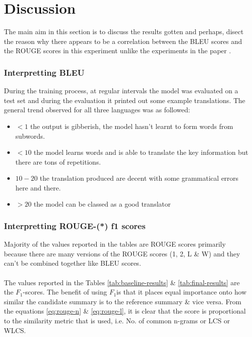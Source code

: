 \documentclass[12pt,a4paper,twoside,openright]{report}
\newcommand{\fone}{$F_1$}
\begin{document}
\section{Discussion}
\label{discussion}
The main aim in this section is to discuss the results gotten and perhaps, disect the reason why there appears to be a correlation between the BLEU scores and the ROUGE scores in this experiment unlike the experiments in the paper \cite{nguyen-daume-iii-2019-global}. 

\subsubsection{Interpretting BLEU}
During the training process, at regular intervals the model was evaluated on a test set and during the evaluation it printed out some example translations. The general trend observed for all three languages was as followed: 
\begin{itemize}
    \item $<1$ the output is gibberish, the model hasn't learnt to form words from subwords.
    \item $<10$ the model learns words and is able to translate the key information but there are tons of repetitions. 
    \item $10-20$ the translation produced are decent with some grammatical errors here and there. 
    \item $>20$ the model can be classed as a good translator 
\end{itemize}

\subsubsection{Interpretting ROUGE-(*) f1 scores}
Majority of the values reported in the tables are ROUGE scores primarily because there are many versions of the ROUGE scores (1, 2, L \& W) and they can't be combined together like BLEU scores. 
\\\\
The values reported in the Tables \ref{tab:baseline-results} \& \ref{tab:final-results} are the \fone-scores. The benefit of using \fone  is that it places equal importance onto how similar the candidate summary is to the reference summary \& vice versa. From the equations \ref{eq:rouge-n} \& \ref{eq:rouge-l}, it is clear that the score is proportional to the similarity metric that is used, i.e. No. of common n-grams or LCS or WLCS. 
\end{document}
